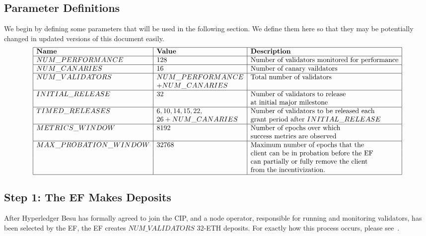 \subsection{Parameter Definitions}
We begin by defining some parameters that will be used in the following section.  We define them here so that they may be potentially changed in updated versions of this document easily.
\[
\begin{array}{|l|l|l|}
\hline
\textbf{Name} & \textbf{Value} & \textbf{Description} \\
\hline
NUM\_PERFORMANCE & 128 & \text{Number of validators monitored for performance} \\
\hline
NUM\_CANARIES & 16 & \text{Number of canary vaildators} \\
\hline
NUM\_VALIDATORS & NUM\_PERFORMANCE & \text{Total number of validators} \\
&  + NUM\_CANARIES & \\
\hline
INITIAL\_RELEASE & 32 & \text{Number of validators to release} \\
& &  \text{at initial major milestone} \\
\hline
TIMED\_RELEASES & 6, 10, 14, 15, 22, & \text{Number of validators to be released each} \\
& 26 + NUM\_CANARIES & \text{grant period after } INITIAL\_RELEASE \\
\hline
METRICS\_WINDOW & 8192 & \text{Number of epochs over which} \\
& & \text{success metrics are observed} \\
\hline
MAX\_PROBATION\_WINDOW & 32768 & \text{Maximum number of epochs that the} \\
& & \text{client can be in probation before the EF} \\
& & \text{can partially or fully remove the client} \\
& & \text{from the incentivization.} \\
\hline
\end{array}
\]

\subsection{Step 1:  The EF Makes Deposits}
After Hyperledger Besu has formally agreed to join the CIP, and a node operator, responsible for running and monitoring validators, has been selected by the EF, the EF creates $NUM\_VALIDATORS$ $32$-ETH deposits.  For exactly how this process occurs, please see~\cite{EthVal}.

